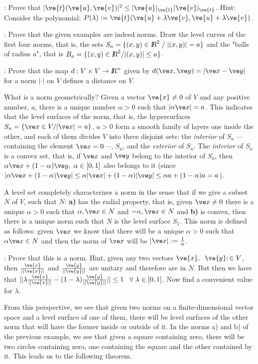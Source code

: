 \ejer: Prove that $|\ve{t}(\ve{u},\ve{v})|^2 \leq |\ve{u}|_{\ve{t}} |\ve{v}|_{\ve{t}}$. Hint: Consider the polynomial: $P(\lambda) := \ve{t}(\ve{u} + \lambda \ve{v},\ve{u} + \lambda \ve{v})$.

\ejer: Prove that the given examples are indeed norms. Draw the level curves of the first four norms, that is, the sets $S_a=\{(x,y)\in \mbox{\sl {l$\!\!\!\;\:\!$R}}^2\;/\; |(x,y)|=a\}$ and the "balls of radius $a$", that is $B_a=\{(x,y)\in \mbox{\sl {l$\!\!\!\;\:\!$R}}^2/|(x,y)|\leq a\}$.

\ejer: Prove that the map $d:V\times V \to \mbox{\sl {l$\!\!\!\;\:\!$R}}^+$ given by $d(\ve x,\ve y) = |\ve x-\ve y|$ for a norm $|\cdot|$ on $V$ defines a distance on $V$.

What is a norm geometrically? Given a vector $\ve{x}\neq 0$ of $V$ and any positive number, $a$, there is a unique number $\alpha > 0$ such that $|\alpha \ve x|=a$. This indicates that the level surfaces of the norm, that is, the hypersurfaces $S_a=\{\ve x\in V / |\ve x|=a\}$, $a>0$ form a smooth family of layers one inside the other, and each of them divides $V$ into three disjoint sets: the {\it interior} of $S_a$ ---containing the element $\ve x=0$---, $S_a$, and the {\it exterior} of $S_a$. The {\it interior} of $S_a$ is a convex set, that is, if $\ve x$ and $\ve y$ belong to the interior of $S_a$, then $\alpha \ve x+(1-\alpha)\ve y,\;\alpha\in[0,1]$ also belongs to it (since $|\alpha \ve x + (1-\alpha )\ve y| \leq \alpha |\ve x| + (1-\alpha )|\ve y| \leq \alpha a + (1-\alpha )a = a$).

A level set completely characterizes a norm in the sense that if we give a subset $N$ of $V$, such that $N$: \textbf{a)} has the radial property, that is, given $\ve x\neq 0$ there is a unique $\alpha >0$ such that $\alpha ,\ve x\in N$ and $-\alpha ,\ve x\in N$ and \textbf{b)} is convex, then there is a unique norm such that $N$ is the level surface $S_1$. This norm is defined as follows: given $\ve x$ we know that there will be a unique $\alpha > 0$ such that $\alpha \ve x \in N$ and then the norm of $\ve x$ will be $|\ve x| := \frac1{\alpha}$.

\ejer: Prove that this is a norm. Hint, given any two vectors $\ve{x},\;\; \ve{y} ; \in V$, then $\frac{\ve{x}}{||\ve{x}||}$ and $\frac{\ve{y}}{||\ve{y}||}$ are unitary and therefore are in $N$. But then we have that $||\lambda \frac{\ve{x}}{||\ve{x}||} - (1-\lambda)\frac{\ve{y}}{||\ve{y}||}|| \leq 1\;\;\;\forall \; \lambda \in [0,1]$. Now find a convenient value for $\lambda$.

From this perspective, we see that given two norms on a finite-dimensional vector space and a level surface of one of them, there will be level surfaces of the other norm that will have the former inside or outside of it. In the norms a) and b) of the previous example, we see that given a square containing zero, there will be two circles containing zero, one containing the square and the other contained by it. This leads us to the following theorem.

